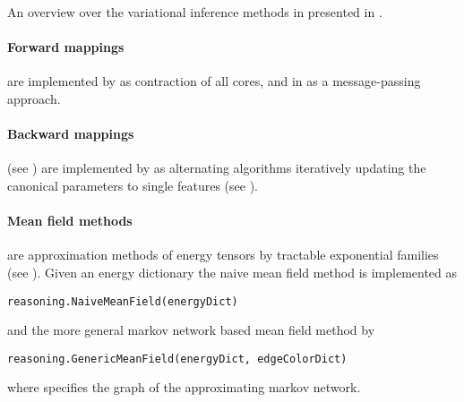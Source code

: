 An overview over the variational inference methods in presented in .

\paragraph{Forward mappings} are implemented by  as contraction of all cores, and in  as a message-passing approach.

\paragraph{Backward mappings} (see ) are implemented by  as alternating algorithms iteratively updating the canonical parameters to single features (see ).

\paragraph{Mean field methods} are approximation methods of energy tensors by tractable exponential families (see ).
Given an energy dictionary the naive mean field method is implemented as %
\begin{lstlisting}
reasoning.NaiveMeanField(energyDict)
\end{lstlisting}
and the more general markov network based mean field method by
\begin{lstlisting}
reasoning.GenericMeanField(energyDict, edgeColorDict)
\end{lstlisting}
where  specifies the graph of the approximating markov network.


